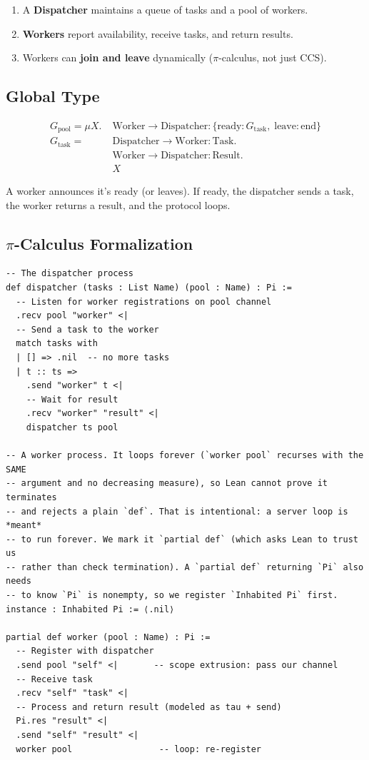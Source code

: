 \documentclass[11pt, a4paper, oneside]{book}
\begin{document}
\begin{enumerate}[nosep]
\item A \textbf{Dispatcher} maintains a queue of tasks and a pool of workers.
\item \textbf{Workers} report availability, receive tasks, and return results.
\item Workers can \textbf{join and leave} dynamically ($\pi$-calculus, not
  just CCS).
\end{enumerate}

\subsection{Global Type}

\begin{align*}
  G_{\text{pool}} = \mu X.\; &\text{Worker} \to \text{Dispatcher} :
    \{\text{ready} : G_{\text{task}},\; \text{leave} : \text{end}\} \\
  G_{\text{task}} = \;&\text{Dispatcher} \to \text{Worker} : \text{Task}. \\
    &\text{Worker} \to \text{Dispatcher} : \text{Result}. \\
    &X
\end{align*}

A worker announces it's ready (or leaves). If ready, the dispatcher sends a
task, the worker returns a result, and the protocol loops.

\subsection{$\pi$-Calculus Formalization}

\begin{leanbox}
\begin{verbatim}
-- The dispatcher process
def dispatcher (tasks : List Name) (pool : Name) : Pi :=
  -- Listen for worker registrations on pool channel
  .recv pool "worker" <|
  -- Send a task to the worker
  match tasks with
  | [] => .nil  -- no more tasks
  | t :: ts =>
    .send "worker" t <|
    -- Wait for result
    .recv "worker" "result" <|
    dispatcher ts pool

-- A worker process. It loops forever (`worker pool` recurses with the SAME
-- argument and no decreasing measure), so Lean cannot prove it terminates
-- and rejects a plain `def`. That is intentional: a server loop is *meant*
-- to run forever. We mark it `partial def` (which asks Lean to trust us
-- rather than check termination). A `partial def` returning `Pi` also needs
-- to know `Pi` is nonempty, so we register `Inhabited Pi` first.
instance : Inhabited Pi := ⟨.nil⟩

partial def worker (pool : Name) : Pi :=
  -- Register with dispatcher
  .send pool "self" <|       -- scope extrusion: pass our channel
  -- Receive task
  .recv "self" "task" <|
  -- Process and return result (modeled as tau + send)
  Pi.res "result" <|
  .send "self" "result" <|
  worker pool                 -- loop: re-register
\end{verbatim}
\end{leanbox}
\end{document}
